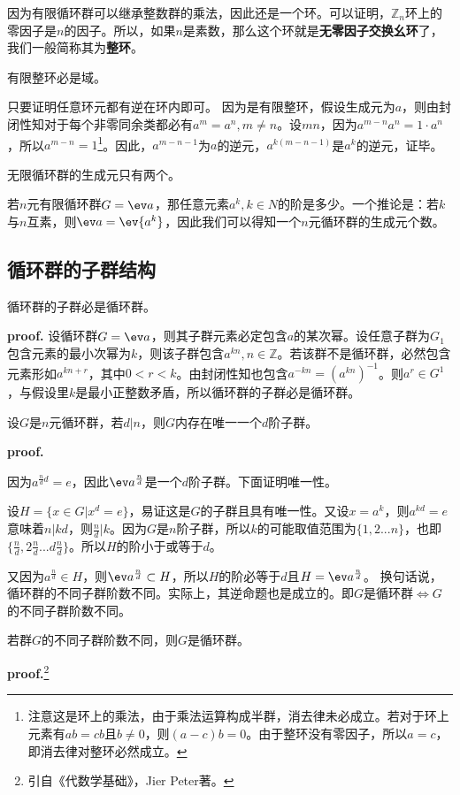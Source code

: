 因为有限循环群可以继承整数群的乘法，因此还是一个环。可以证明，$\mathbb Z_n$环上的零因子是$n$的因子。所以，如果$n$是素数，那么这个环就是\textbf{无零因子交换幺环}了，我们一般简称其为\textbf{整环}。
\begin{theorem}{}\label{the_cyclic_4}
有限整环必是域。
\end{theorem}
只要证明任意环元都有逆在环内即可。
因为是有限整环，假设生成元为$a$，则由封闭性知对于每个非零同余类都必有$a^m=a^n,m\neq n$。设$m n$，因为$a^{m-n}a^n=1\cdot a^n$，所以$a^{m-n}=1$\footnote{注意这是环上的乘法，由于乘法运算构成半群，消去律未必成立。若对于环上元素有$ab=cb$且$b\neq 0$，则$(a-c)b=0$。由于整环没有零因子，所以$a=c$，即消去律对整环必然成立。}。因此，$a^{m-n-1}$为$a$的逆元，$a^{k(m-n-1)}$是$a^k$的逆元，证毕。
\begin{exercise}{}
无限循环群的生成元只有两个。
\end{exercise}
\begin{exercise}{}
若$n$元有限循环群$G=\ev a$，那任意元素$a^k,k\in N$的阶是多少。一个推论是：若$k$与$n$互素，则$\ev a=\ev {a^k}$，因此我们可以得知一个$n$元循环群的生成元个数。
\end{exercise}
\subsection{循环群的子群结构}
\begin{theorem}{}\label{the_cyclic_1}
循环群的子群必是循环群。
\end{theorem}
\textbf{proof.}
设循环群$G=\ev a$，则其子群元素必定包含$a$的某次幂。设任意子群为$G_1$包含元素的最小次幂为$k$，则该子群包含$a^{kn},n\in \mathbb Z$。若该群不是循环群，必然包含元素形如$a^{kn+r}$，其中$0< r<k$。由封闭性知也包含$a^{-kn}=(a^{kn})^{-1}$。则$a^{r}\in G^{1}$，与假设里$k$是最小正整数矛盾，所以循环群的子群必是循环群。
\begin{theorem}{}
设$G$是$n$元循环群，若$d|n$，则$G$内存在唯一一个$d$阶子群。
\end{theorem}
\textbf{proof.}

因为$a^{\frac{n}{d}d}=e$，因此$\ev a^{\frac{n}{d}}$是一个$d$阶子群。下面证明唯一性。

设$H=\{x\in G|x^d=e\}$，易证这是$G$的子群且具有唯一性。又设$x=a^k$，则$a^{kd}=e$意味着$n|kd$，则$\frac{n}{d}|k$。因为$G$是$n$阶子群，所以$k$的可能取值范围为$\{1,2...n\}$，也即$\{\frac{n}{d},2\frac{n}{d}...d\frac{n}{d}\}$。所以$H$的阶小于或等于$d$。

又因为$a^{\frac{n}{d}}\in H$，则$\ev a^{\frac{n}{d}}\subset H$，所以$H$的阶必等于$d$且$H=\ev a^{\frac{n}{d}}$。
换句话说，循环群的不同子群阶数不同。实际上，其逆命题也是成立的。即$G$是循环群$\Longleftrightarrow G$的不同子群阶数不同。
\begin{theorem}{}\label{the_cyclic_2}
若群$G$的不同子群阶数不同，则$G$是循环群。
\end{theorem}
\textbf{proof.}\footnote{引自《代数学基础》，Jier Peter著。}

